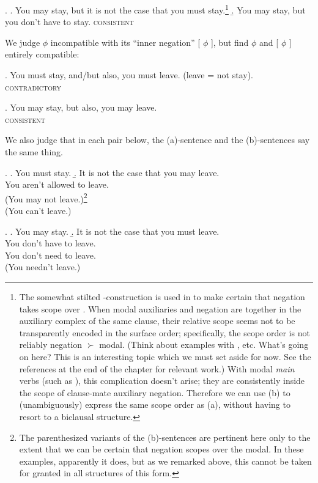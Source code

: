 \ex. \a. You may stay, but it is not the case that you must stay.\footnote{The somewhat stilted -construction is used in to make certain that negation takes scope over . When modal auxiliaries and negation are together in the auxiliary complex of the same clause, their relative scope seems not to be transparently encoded in the surface order; specifically, the scope order is not reliably negation $\succ$ modal. (Think about examples with ,  etc. What's going on here? This is an interesting topic which we must set aside for now. See the references at the end of the chapter for relevant work.) With modal \emph{main} verbs (such as ), this complication doesn't arise; they are consistently inside the scope of clause-mate auxiliary negation. Therefore we can use (b) to (unambiguously) express the same scope order as (a), without having to resort to a biclausal structure.} \b. You may stay, but you don't have to stay. \hfill\textsc{consistent}

We judge  $\phi$ incompatible with its ``inner negation''  [ $\phi$ ], but find  $\phi$ and  [ $\phi$ ] entirely compatible:

\ex. You must stay, and/but also, you must leave. (leave = not stay).\\
\null\hfill\textsc{contradictory}

\ex. You may stay, but also, you may leave. \\
\null\hfill\textsc{consistent}

We also judge that in each pair below, the (a)-sentence and the (b)-sentences say the same thing.

\ex. \a. You must stay. \b. It is not the case that you may leave.\\
You aren't allowed to leave.\\
(You may not leave.)\footnote{The parenthesized variants of the (b)-sentences are pertinent here only to the extent that we can be certain that negation scopes over the modal. In these examples, apparently it does, but as we remarked above, this cannot be taken for granted in all structures of this form.}\\
(You can't leave.)

\ex. \a. You may stay. \b. It is not the case that you must leave.\\
You don't have to leave.\\
You don't need to leave.\\
(You needn't leave.)

